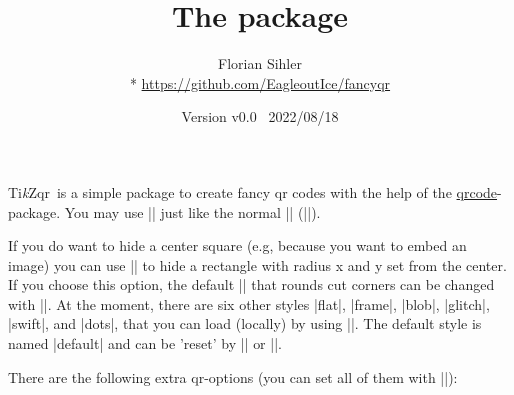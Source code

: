 \documentclass{article}
\title{The \texorpdfstring{\tikzqr}{fancyqr} package}
\author{%
	\texorpdfstring{Florian Sihler\\*
		\url{https://github.com/EagleoutIce/fancyqr}
	}{Florian Sihler}}
\date{Version v0.0 \textendash\ 2022/08/18}
\def\TikZ{Ti\textit{k}Z}
\def\tikzqr{\TikZ qr}
\begin{document}
   \maketitle


	\tikzqr\ is a simple package to create fancy qr codes with the help of the \href{https://www.ctan.org/pkg/qrcode}{qrcode}-package.
	You may use |\fancyqr| just like the normal |\qrcode| (||).

	If you do want to hide a center square (e.g, because you want to embed an image) you can use || to hide a rectangle with radius x and y set from the center. If you choose this option, the default |\FancyQrRoundCut| that rounds cut corners can be changed with |\FancyQrHardCut|.
	At the moment, there are six other styles |flat|, |frame|, |blob|, |glitch|, |swift|, and |dots|, that you can load (locally) by using ||. The default style is named |default| and can be 'reset' by || or |\FancyLoadDefault|.

	There are the following extra qr-options (you can set all of them with ||):



\end{document}

